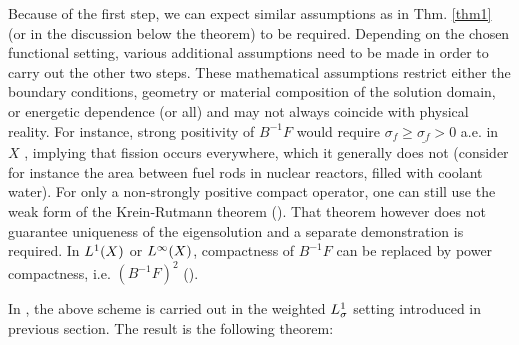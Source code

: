 Because of the first step, we can expect similar assumptions as in Thm. \ref{thm1} (or in the discussion below the
theorem) to be required. Depending on the chosen functional setting, various additional assumptions need to be made in
order to carry out the other two steps.
These mathematical assumptions restrict either the boundary conditions, geometry or material composition of the solution
domain, or energetic dependence (or all) and may not always coincide with physical reality. For instance, strong
positivity of $B^{-1}F$ would require $\sigma_f \geq \underline{\sigma_f} > 0$ a.e. in $X$%
% 
, implying
that fission occurs everywhere, which it generally does not (consider for instance the area between fuel rods in nuclear
reactors, filled with coolant water). For only a non-strongly positive compact operator, one can still use the weak form
of the Krein-Rutmann theorem (\cite[Prop. 5.4.32]{DrabekNFA}). That theorem however does not guarantee uniqueness of the
eigensolution and a separate demonstration is required. In $\Lp[1](X)$ or $\Lp[\infty](X)$, compactness of $B^{-1}F$ can
be replaced by power compactness, i.e. $(B^{-1}F)^2$ (\cite{Sanchez3}).

In \cite{Sanchez3}, the above scheme is carried out in the weighted $\Lp[1]_{\sigma}$ setting introduced in previous
section. The result is the following theorem:

